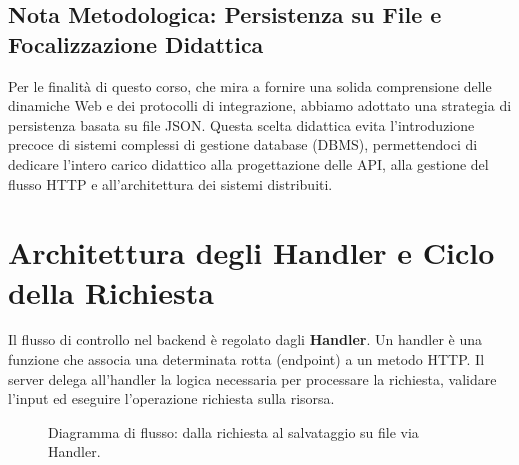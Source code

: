 \documentclass[11pt,a4paper]{report}
\begin{document}
\subsection*{Nota Metodologica: Persistenza su File e Focalizzazione Didattica}
Per le finalità di questo corso, che mira a fornire una solida comprensione delle dinamiche Web e dei protocolli di integrazione, abbiamo adottato una strategia di persistenza basata su file JSON. Questa scelta didattica evita l'introduzione precoce di sistemi complessi di gestione database (DBMS), permettendoci di dedicare l'intero carico didattico alla progettazione delle API, alla gestione del flusso HTTP e all'architettura dei sistemi distribuiti.

\section{Architettura degli Handler e Ciclo della Richiesta}
Il flusso di controllo nel backend è regolato dagli \textbf{Handler}. Un handler è una funzione che associa una determinata rotta (endpoint) a un metodo HTTP. Il server delega all'handler la logica necessaria per processare la richiesta, validare l'input ed eseguire l'operazione richiesta sulla risorsa.

\begin{figure}[ht]
\centering
{}
\caption{Diagramma di flusso: dalla richiesta al salvataggio su file via Handler.}
\end{figure}
\end{document}
